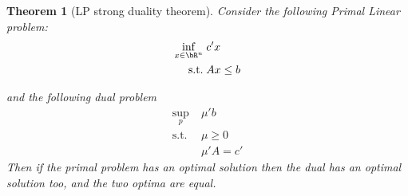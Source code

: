 \documentclass[11pt,a4paper,oneside,openany]{book}
\newtheorem{theorem}{Theorem}
\numberwithin{definition}{section}
\numberwithin{theorem}{section}
\numberwithin{problem}{section}
\begin{document}
\begin{theorem}[LP strong duality theorem] \label{LP strong duality theorem}
    Consider the following Primal Linear problem: 
    \begin{equation}
        \begin{aligned} \label{primal LP}
            \inf_{x \in \bR^n} &\; c'x \\
            \text{s.t.} &\; Ax \leq b
        \end{aligned}
    \end{equation}
    
    and the following dual problem
    \begin{equation}
        \begin{aligned} \label{dual LP}
            \sup_{p} &\; \mu'b \\
            \text{s.t.} &\; \mu \geq 0 \\
            &\; \mu'A = c'
        \end{aligned}
    \end{equation}
    Then if the primal problem has an optimal solution then the dual has an optimal solution too, and the two optima are equal.
\end{theorem}
\end{document}
